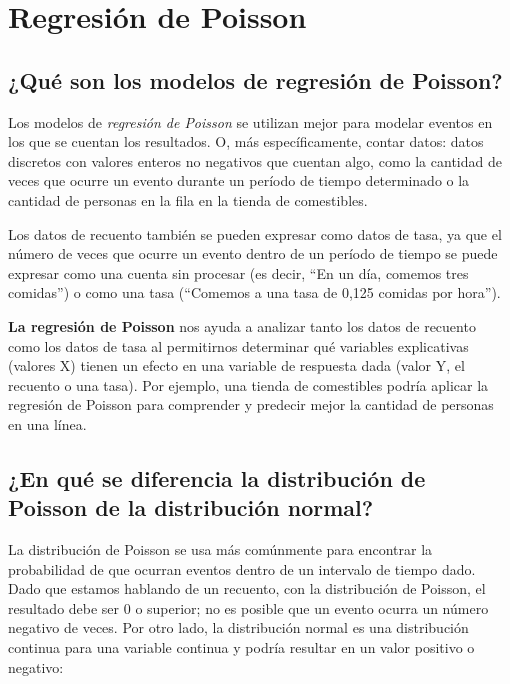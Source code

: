 \documentclass[
]{book}
\begin{document}
\hypertarget{regresiuxf3n-de-poisson}{%
\chapter{Regresión de Poisson}\label{regresiuxf3n-de-poisson}}

\hypertarget{quuxe9-son-los-modelos-de-regresiuxf3n-de-poisson}{%
\section{¿Qué son los modelos de regresión de Poisson?}\label{quuxe9-son-los-modelos-de-regresiuxf3n-de-poisson}}

Los modelos de \emph{regresión de Poisson} se utilizan mejor para modelar eventos en los que se cuentan los resultados. O, más específicamente, contar datos: datos discretos con valores enteros no negativos que cuentan algo, como la cantidad de veces que ocurre un evento durante un período de tiempo determinado o la cantidad de personas en la fila en la tienda de comestibles.

Los datos de recuento también se pueden expresar como datos de tasa, ya que el número de veces que ocurre un evento dentro de un período de tiempo se puede expresar como una cuenta sin procesar (es decir, ``En un día, comemos tres comidas'') o como una tasa (``Comemos a una tasa de 0,125 comidas por hora'').

\textbf{La regresión de Poisson} nos ayuda a analizar tanto los datos de recuento como los datos de tasa al permitirnos determinar qué variables explicativas (valores X) tienen un efecto en una variable de respuesta dada (valor Y, el recuento o una tasa). Por ejemplo, una tienda de comestibles podría aplicar la regresión de Poisson para comprender y predecir mejor la cantidad de personas en una línea.

\hypertarget{en-quuxe9-se-diferencia-la-distribuciuxf3n-de-poisson-de-la-distribuciuxf3n-normal}{%
\section{¿En qué se diferencia la distribución de Poisson de la distribución normal?}\label{en-quuxe9-se-diferencia-la-distribuciuxf3n-de-poisson-de-la-distribuciuxf3n-normal}}

La distribución de Poisson se usa más comúnmente para encontrar la probabilidad de que ocurran eventos dentro de un intervalo de tiempo dado. Dado que estamos hablando de un recuento, con la distribución de Poisson, el resultado debe ser 0 o superior; no es posible que un evento ocurra un número negativo de veces. Por otro lado, la distribución normal es una distribución continua para una variable continua y podría resultar en un valor positivo o negativo:
\end{document}
